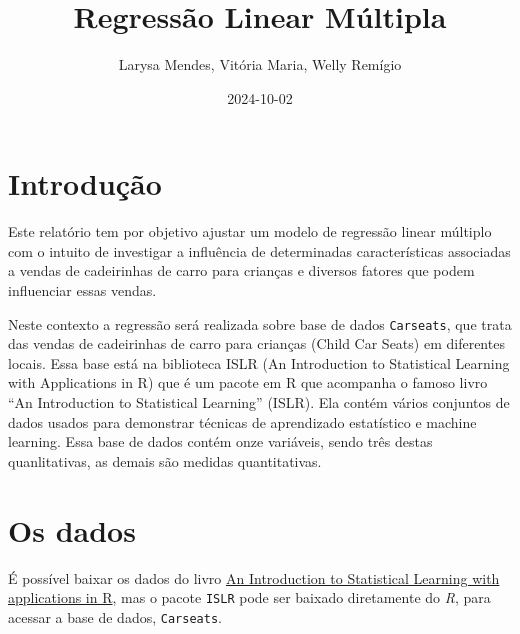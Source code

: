 \documentclass[
  letterpaper,
  DIV=11,
  numbers=noendperiod]{scrartcl}
\title{Regressão Linear Múltipla}
\author{Larysa Mendes, Vitória Maria, Welly Remígio}
\date{2024-10-02}
\newenvironment{Shaded}{\begin{snugshade}}{\end{snugshade}}
\newcommand{\AttributeTok}[1]{\textcolor[rgb]{0.40,0.45,0.13}{#1}}
\newcommand{\CommentTok}[1]{\textcolor[rgb]{0.37,0.37,0.37}{#1}}
\newcommand{\ConstantTok}[1]{\textcolor[rgb]{0.56,0.35,0.01}{#1}}
\newcommand{\FunctionTok}[1]{\textcolor[rgb]{0.28,0.35,0.67}{#1}}
\newcommand{\NormalTok}[1]{\textcolor[rgb]{0.00,0.23,0.31}{#1}}
\newcommand{\SpecialCharTok}[1]{\textcolor[rgb]{0.37,0.37,0.37}{#1}}
\newcommand{\StringTok}[1]{\textcolor[rgb]{0.13,0.47,0.30}{#1}}
\begin{document}
\maketitle


\begin{Shaded}
\end{Shaded}

\section{Introdução}\label{introduuxe7uxe3o}

Este relatório tem por objetivo ajustar um modelo de regressão linear
múltiplo com o intuito de investigar a influência de determinadas
características associadas a vendas de cadeirinhas de carro para
crianças e diversos fatores que podem influenciar essas vendas.

Neste contexto a regressão será realizada sobre base de dados
\texttt{Carseats}, que trata das vendas de cadeirinhas de carro para
crianças (Child Car Seats) em diferentes locais. Essa base está na
biblioteca ISLR (An Introduction to Statistical Learning with
Applications in R) que é um pacote em R que acompanha o famoso livro
``An Introduction to Statistical Learning'' (ISLR). Ela contém vários
conjuntos de dados usados para demonstrar técnicas de aprendizado
estatístico e machine learning. Essa base de dados contém onze
variáveis, sendo três destas quanlitativas, as demais são medidas
quantitativas.

\section{Os dados}\label{os-dados}

É possível baixar os dados do livro
\href{https://www.statlearning.com/}{An Introduction to Statistical
Learning with applications in R}, mas o pacote \texttt{ISLR} pode ser
baixado diretamente do \emph{R}, para acessar a base de dados,
\texttt{Carseats}.
\end{document}
